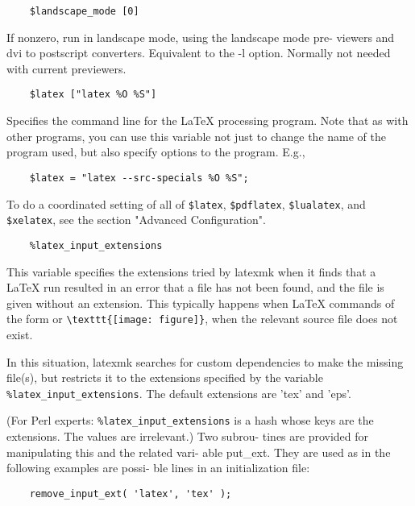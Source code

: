 \begin{verbatim}
	$landscape_mode [0]
\end{verbatim}

If nonzero, run in landscape mode, using the landscape mode pre-
viewers and dvi to postscript converters.  Equivalent to the  -l
option.  Normally not needed with current previewers.

\begin{verbatim}
	$latex ["latex %O %S"]
\end{verbatim}

Specifies  the  command  line  for the LaTeX processing program.
Note that as with other programs, you can use this variable  not
just  to  change  the name of the program used, but also specify
options to the program.  E.g.,

\begin{verbatim}
	$latex = "latex --src-specials %O %S";
\end{verbatim}

To do a coordinated setting of all of \verb|$latex|, \verb|$pdflatex|,
\verb|$lualatex|, and \verb|$xelatex|, see the section "Advanced
Configuration".


\begin{verbatim}
	%latex_input_extensions
\end{verbatim}

This  variable specifies the extensions tried by latexmk when it
finds that a LaTeX run resulted in an error that a file has  not
been  found,  and  the file is given without an extension.  This
typically happens when LaTeX commands of the  form  \verb||
or  \verb|\texttt{[image: figure]}|, when the relevant source file does
not exist.

In this situation, latexmk searches for custom  dependencies  to
make  the  missing  file(s),  but restricts it to the extensions
specified by the variable \verb|%latex_input_extensions|.  The  default
extensions are 'tex' and 'eps'.

(For  Perl experts: \verb|%latex_input_extensions| is a hash whose keys
are the extensions.  The values are  irrelevant.)   Two  subrou-
tines  are  provided for manipulating this and the related vari-
able %
put_ext.   They are used as in the following examples are possi-
ble lines in an initialization file:

\begin{verbatim}
	remove_input_ext( 'latex', 'tex' );
\end{verbatim}

